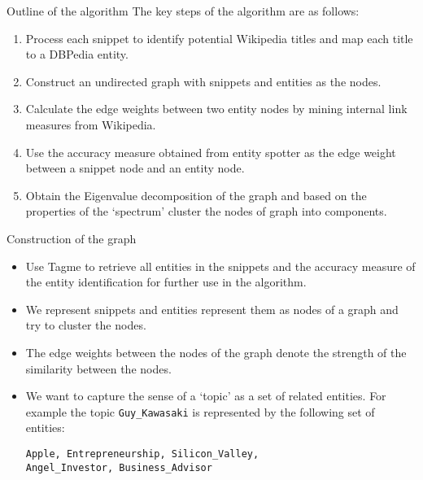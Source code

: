 \documentclass{beamer}
\begin{document}
\begin{frame}{Outline of the algorithm}
The key steps of the algorithm are as follows:
\begin{enumerate}
  \item Process each snippet to identify potential Wikipedia titles
    and map each title to a DBPedia entity.
  \item Construct an undirected graph with snippets and entities as
    the nodes.
  \item Calculate the edge weights between two entity nodes by mining
    internal link measures from Wikipedia.
  \item Use the accuracy measure obtained from entity spotter as the
    edge weight between a snippet node and an entity node.
  \item Obtain the Eigenvalue decomposition of the graph and based on
    the properties of the `spectrum' cluster the nodes of graph into
    components.
\end{enumerate}
\end{frame}

\begin{frame}[fragile]{Construction of the graph}
\begin{itemize}
  \item Use Tagme to retrieve all entities in the snippets and the
    accuracy measure of the entity identification for further use in
    the algorithm.
  \item We represent snippets and entities represent them as nodes of
    a graph and try to cluster the nodes. 
  \item The edge weights between the nodes of the graph denote the
    strength of the similarity between the nodes. 
  \item We want to capture the sense of a `topic' as a set of related
    entities.  For example the topic \verb|Guy_Kawasaki| is
    represented by the following set of entities:
\begin{verbatim}
Apple, Entrepreneurship, Silicon_Valley, 
Angel_Investor, Business_Advisor 
\end{verbatim}
\end{itemize}
\end{frame}
\end{document}
